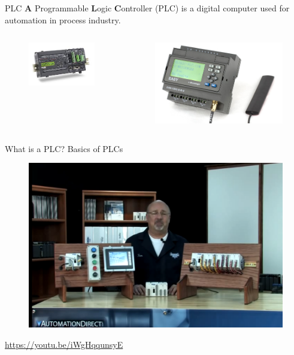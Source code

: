 \begin{frame}{PLC}
	\textbf A {P}rogrammable \textbf{L}ogic \textbf{C}ontroller (PLC) is a digital computer used for automation in process industry. 
	\begin{columns}
		\begin{column}{0.5\textwidth}
			\begin{figure}
				\centering
				\includegraphics[width=0.7\linewidth]{img/PLC_1}
			\end{figure}

		\end{column}
		\begin{column}{0.5\textwidth}
			\begin{figure}
				\centering
				\includegraphics[width=0.7\linewidth]{img/PLC_2}
			\end{figure}
		\end{column}
	\end{columns}
\end{frame}

\begin{frame}{What is a PLC? Basics of PLCs}
	\begin{figure}
		\centering
		\includegraphics[width=0.7\linewidth]{img/what_is_a_plc}
	\end{figure}
	\url{https://youtu.be/iWgHqqunsyE}
\end{frame}


